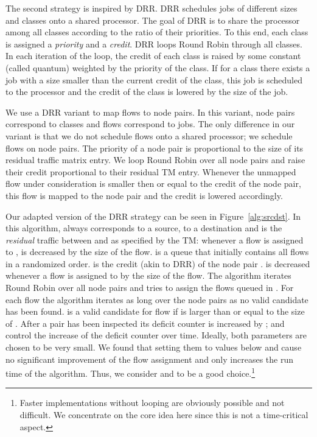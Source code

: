 \documentclass[journal,10pt]{IEEEtran}
\begin{document}
The second strategy is inspired by DRR. DRR schedules jobs of different sizes and classes onto a shared processor.
The goal of DRR is to share the processor among all classes according to the ratio of their priorities. 
To this end, each class is assigned a \emph{priority} and a \emph{credit}. 
DRR loops Round Robin through all classes. 
In each iteration of the loop, the credit of each class is raised by some constant (called quantum) weighted by the priority of the class.
If for a class there exists a job with a size smaller than the current credit of the class,
this job is scheduled to the processor and the credit of the class is lowered by the size of the job.


We use a DRR variant to map flows to node pairs. 
In this variant, node pairs correspond to classes and
flows correspond to jobs. The only difference in our variant is that we do not schedule flows onto a shared processor; we schedule flows on node pairs.
The priority of a node pair is proportional to the size of its residual traffic matrix entry.
We loop Round Robin over all node pairs and raise their credit proportional to their residual TM entry.
Whenever the unmapped flow under consideration is smaller then or equal to the credit of the node pair, this flow is mapped to the node pair and the 
credit is lowered accordingly.

Our adapted version of the DRR strategy can be seen in Figure~\ref{alg:srcdst}. 
In this algorithm,  always corresponds to a source,  to a destination and
 is the \emph{residual} traffic between  and  as specified by the TM:
whenever a flow is assigned to ,  is decreased by the size of the flow.
 is a queue that initially contains all flows in a randomized order.
 is the credit (akin to DRR) of the node pair . 
 is decreased whenever a flow is assigned to 
by the size of the flow. 
The algorithm iterates Round Robin over all node pairs and tries to assign the flows queued in .
For each flow  the algorithm iterates as long over the node pairs  as no valid candidate has been found. 
 is a valid candidate for flow  if  is larger than or equal to the size of .
After a pair  has been inspected its deficit counter is increased by ;
 and  control the increase of the deficit counter over time.
Ideally, both parameters are chosen to be very small. 
We found that setting them to values below  and  cause no significant improvement of the flow assignment and 
only increases the run time of the algorithm. Thus, we consider  and  to be a good choice.\footnote{Faster implementations without looping are obviously possible and not difficult. 
We concentrate on the core idea here since this is not a time-critical aspect.}
\end{document}

